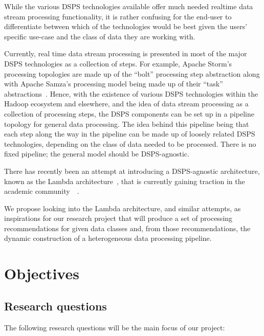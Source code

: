 \documentclass[a4paper,11pt]{article}
\begin{document}
While the various DSPS technologies available offer much needed realtime data stream processing functionality, it is
rather confusing for the end-user to differentiate between which of the technologies would be best given the users'
specific use-case and the class of data they are working with.

Currently, real time data stream processing is presented in most of the major DSPS technologies as a collection of
steps. For example, Apache Storm's processing topologies are made up of the ``bolt'' processing step abstraction along
with Apache Samza's processing model being made up of their ``task'' abstractions~\cite{kamburugamuve_survey_2014}.
Hence, with the existence of various DSPS technologies within the Hadoop ecosystem and elsewhere, and the idea of data
stream processing as a collection of processing steps, the DSPS components can be set up in a pipeline topology for
general data processing. The idea behind this pipeline being that each step along the way in the pipeline can be made up
of loosely related DSPS technologies, depending on the class of data needed to be processed. There is no fixed pipeline;
the general model should be DSPS-agnostic.

There has recently been an attempt at introducing a DSPS-agnostic architecture, known as the Lambda
architecture~\cite{marz2013principles}, that is currently gaining traction in the academic
community~\cite{islam_cloud_2014}~\cite{liu_survey_2014}.

We propose looking into the Lambda architecture, and similar attempts, as inspirations for our research project that
will  produce a set of processing recommendations for given data classes and, from those recommendations, the dynamic
construction of a heterogeneous data processing pipeline.




\newpage


\section{Objectives} %
\label{sec:objectives}

\subsection{Research questions} %
\label{sub:research_questions}

The following research questions will be the main focus of our project:
\end{document}
